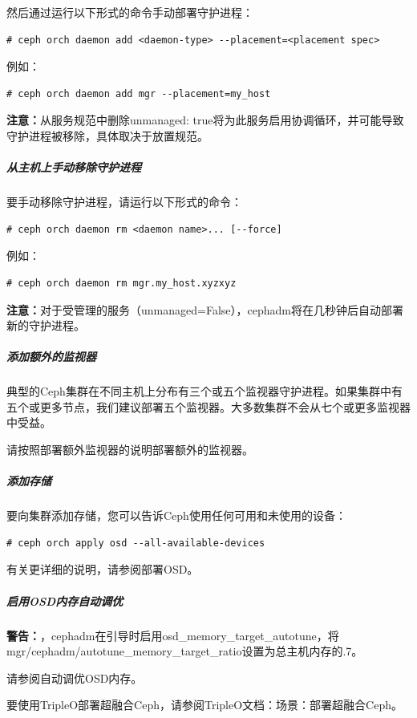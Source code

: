 \documentclass[12pt,UTF8]{ctexbook}
\begin{document}
然后通过运行以下形式的命令手动部署守护进程：

\begin{verbatim}
# ceph orch daemon add <daemon-type> --placement=<placement spec>
\end{verbatim}

例如：

\begin{verbatim}
# ceph orch daemon add mgr --placement=my_host
\end{verbatim}

\textbf{注意：}从服务规范中删除unmanaged: true将为此服务启用协调循环，并可能导致守护进程被移除，具体取决于放置规范。

\subparagraph{从主机上手动移除守护进程}

要手动移除守护进程，请运行以下形式的命令：

\begin{verbatim}
# ceph orch daemon rm <daemon name>... [--force]
\end{verbatim}

例如：

\begin{verbatim}
# ceph orch daemon rm mgr.my_host.xyzxyz
\end{verbatim}

\textbf{注意：}对于受管理的服务（unmanaged=False），cephadm将在几秒钟后自动部署新的守护进程。

\subparagraph{添加额外的监视器}

典型的Ceph集群在不同主机上分布有三个或五个监视器守护进程。如果集群中有五个或更多节点，我们建议部署五个监视器。大多数集群不会从七个或更多监视器中受益。

请按照部署额外监视器的说明部署额外的监视器。

\subparagraph{添加存储}

要向集群添加存储，您可以告诉Ceph使用任何可用和未使用的设备：
\begin{verbatim}
# ceph orch apply osd --all-available-devices
\end{verbatim}

有关更详细的说明，请参阅部署OSD。

\subparagraph{启用OSD内存自动调优}

\textbf{警告：}，cephadm在引导时启用osd_memory_target_autotune，将mgr/cephadm/autotune_memory_target_ratio设置为总主机内存的.7。

请参阅自动调优OSD内存。

要使用TripleO部署超融合Ceph，请参阅TripleO文档：场景：部署超融合Ceph。
\end{document}
